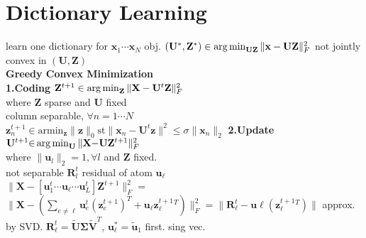 \section*{Dictionary Learning}
learn one dictionary for $\mathbf{x}_1\dotsi\mathbf{x}_N$
obj. $(\mathbf{U}^*,\mathbf{Z}^*)\in\operatorname*{arg\,min}_{\mathbf{U}\mathbf{Z}}\|\mathbf{x}-\mathbf{U}\mathbf{Z}\|_F^2$
not jointly convex in $(\mathbf{U},\mathbf{Z})$\\
\textbf{Greedy Convex Minimization}\\
\textbf{1.Coding} $\mathbf{Z}^{t+1}\in\operatorname*{arg\,min}_{\mathbf{Z}}\|\mathbf{X}-\mathbf{U}^t\mathbf{Z}\|_F^2$\\
where $\mathbf{Z}$ sparse and $\mathbf{U}$ fixed\\
column separable, $\forall n=1\dotsi N$\\
$\mathbf{z}_n^{t+1}{\in}\text{armin}_{\mathbf{z}}\|\mathbf{z}\|_0\text{st} \|\mathbf{x}_n{-}\mathbf{U}^t\mathbf{z}\|^2{\leq}\sigma\|\mathbf{x}_n\|_2$
\textbf{2.Update} $\mathbf{U}^{t+1}{\in}\operatorname*{arg\,min}_{\mathbf{U}}\|\mathbf{X}{-}\mathbf{U}\mathbf{Z}^{t+1}\|_F^2$\\
where $\|\mathbf{u}_l\|_2=1, \forall l$ and $\mathbf{Z}$ fixed.\\
not separable $\mathbf{R}^t_l$ residual of atom $\mathbf{u}_\ell$ \\
$\|\mathbf{X}{-}[\mathbf{u}_1^t\dotsi\mathbf{u}_\ell\dotsi\mathbf{u}_L^t]\mathbf{Z}^{t+1}\|_F^2=$\\
$\|\mathbf{X}{-}(\sum_{e\neq\ell}\mathbf{u}_e^t(\mathbf{z}_e^{t+1})^T+\mathbf{u}_\ell\mathbf{z}_\ell^{t+1}^T)\|_F^2=\|\mathbf{R}_\ell^t-\mathbf{u}\ell(\mathbf{z}_\ell^{t+1}^T)\|$ approx. by SVD.
$\mathbf{R}_\ell^t=\tilde{\mathbf{U}}\mathbf{\Sigma}\mathbf{\tilde{V}}^T$, $\mathbf{u}_\ell^*=\mathbf{\tilde{u}}_1$ first. sing vec.


